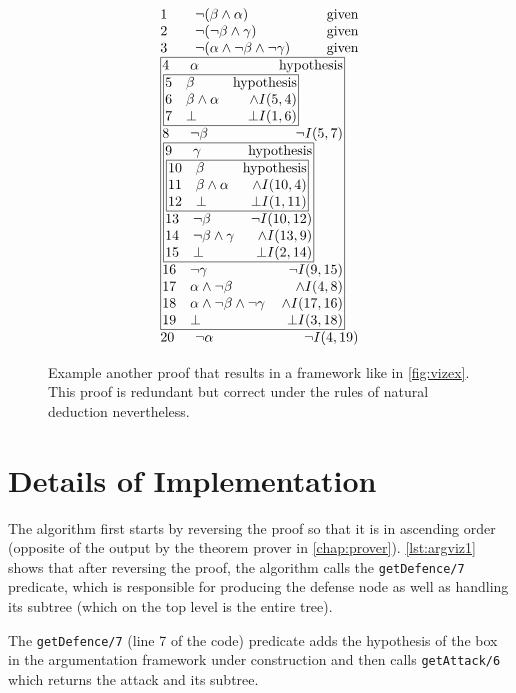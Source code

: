 \documentclass[11pt,twoside,a4paper]{report}
\begin{document}
\begin{figure}[thp]
\[\vbox{\offinterlineskip\halign{
&\tabskip=1.5em#\strut&$#$\hfil\tabskip=1em&\hfil$#$\tabskip=0em\cr
%
1&\neg(\beta\wedge\alpha)&\mbox{given}\cr
2&\neg(\neg\beta\wedge\gamma)&\mbox{given}\cr
3&\neg(\alpha\wedge\neg\beta\wedge\neg\gamma)&\mbox{given}\cr
%
\multispan3\vbox{\halign{
\vrule#&&\hskip.1em\tabskip=1em#\strut&$#$\hfil\tabskip=1em&\hfil$#$\hskip0.1em\tabskip=0em&\vrule#\cr
\noalign{\hrule}
%
&4&\alpha&\mbox{hypothesis}&\cr
%
&\multispan3\,\vbox{\halign{
\vrule#&&\hskip.1em\tabskip=1em#\strut&$#$\hfil\tabskip=1em&\hfil$#$\hskip0.1em\tabskip=0em&\vrule#\cr
\noalign{\hrule}
%
&5&\beta&\mbox{hypothesis}&\cr
&6&\beta\wedge\alpha&\wedge I(5,4)&\cr
&7&\bot&\bot I(1,6)&\cr
%
\noalign{\hrule}}}\,&\cr
%
&8&\neg\beta&\neg I(5,7)&\cr
%
&\multispan3\,\vbox{\halign{
\vrule#&&\hskip.1em\tabskip=1em#\strut&$#$\hfil\tabskip=1em&\hfil$#$\hskip0.1em\tabskip=0em&\vrule#\cr
\noalign{\hrule}
%
&9&\gamma&\mbox{hypothesis}&\cr
%
&\multispan3\,\vbox{\halign{
\vrule#&&\hskip.1em\tabskip=1em#\strut&$#$\hfil\tabskip=1em&\hfil$#$\hskip0.1em\tabskip=0em&\vrule#\cr
\noalign{\hrule}
%
&10&\beta&\mbox{hypothesis}&\cr
&11&\beta\wedge\alpha&\wedge I(10,4)&\cr
&12&\bot&\bot I(1,11)&\cr
%
\noalign{\hrule}}}\,&\cr
%
&13&\neg\beta&\neg I(10,12)&\cr
%
&14&\neg\beta\wedge\gamma&\wedge I(13,9)&\cr
&15&\bot&\bot I(2,14)&\cr
%
\noalign{\hrule}}}\,&\cr
%
&16&\neg\gamma&\neg I(9,15)&\cr
&17&\alpha\wedge\neg\beta&\wedge I(4,8)&\cr
&18&\alpha\wedge\neg\beta\wedge\neg\gamma&\wedge I(17,16)&\cr
&19&\bot&\bot I(3,18)&\cr
%
\noalign{\hrule}}}\,\cr
%
20&\neg\alpha&\neg I(4,19)\cr
}}\]
\caption{Example another proof that results in a framework like in \autoref{fig:vizex}. This proof is redundant but correct under the rules of natural deduction nevertheless.\label{fig:vizexproof2}}
\end{figure}

\section{Details of Implementation}
The algorithm first starts by reversing the proof so that it is in ascending order (opposite of the output by the theorem prover in \autoref{chap:prover}). \autoref{lst:argviz1} shows that after reversing the proof, the algorithm calls the \lstinline$getDefence/7$ predicate, which is responsible for producing the defense node as well as handling its subtree (which on the top level is the entire tree).

The \lstinline$getDefence/7$ (line 7 of the code) predicate adds the hypothesis of the box in the argumentation framework under construction and then calls \lstinline$getAttack/6$ which returns the attack and its subtree.
\end{document}
